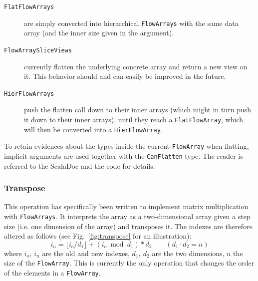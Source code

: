 \documentclass[runningheads,a4paper,fleqn]{llncs}
\begin{document}
\begin{description}
\item[\texttt{FlatFlowArrays}] are simply converted into hierarchical
  \texttt{FlowArrays} with the same data array (and the inner size given in the
  argument).
\item[\texttt{FlowArraySliceViews}] currently flatten the underlying
  concrete array and return a new view on it. This behavior should and
  can easily be improved in the future.
\item[\texttt{HierFlowArrays}] push the flatten call down to their
  inner arrays (which might in turn push it down to their inner
  arrays), until they reach a \texttt{FlatFlowArray}, which will then
  be converted into a \texttt{HierFlowArray}.
\end{description}

To retain evidences about the types inside the current \texttt{FlowArray} when
flatting, implicit arguments are used together with the
\texttt{CanFlatten} type. The reader is referred to the ScalaDoc and
the code for details.

\subsubsection{Transpose}
This operation has specifically been written to implement matrix
multiplication with \texttt{FlowArrays}. It interprets the array as a
two-dimensional array given a step size (i.e. one dimension of the
array) and transposes it. The indexes are therefore altered as
follows (see Fig.~\ref{fig:transpose} for an illustration):
\[ i_n = \lfloor i_o / d_1 \rfloor + (i_o \bmod d_1) * d_2 \qquad (d_1
\cdot d_2 = n)\]
where $i_o,\ i_n$ are the old and new indexes, $d_1,\ d_2$ are the two
dimensions, $n$ the size of the \texttt{FlowArray}. This is currently the only
operation that changes the order of the elements in a \texttt{FlowArray}.
\end{document}
